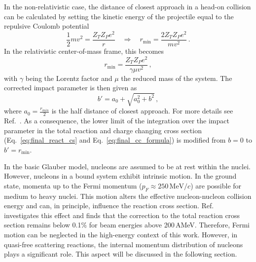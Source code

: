 \begin{description}
In the non-relativistic case, the distance of closest approach in a head-on collision can be calculated by setting the kinetic energy of the projectile equal to the repulsive Coulomb potential
\begin{equation}
\frac{1}{2}mv^{2} = \frac{Z_T Z_P e^{2}}{r} \quad \Rightarrow \quad r_{\text{min}} = \frac{2 Z_T Z_P e^{2}}{m v^2} \, .
\end{equation}
In the relativistic center-of-mass frame, this becomes
\begin{equation}
r_{\text{min}} = \frac{Z_T Z_P e^{2}}{\gamma \mu v^2} \, ,
\end{equation}
with $\gamma$ being the Lorentz factor and $\mu$ the reduced mass of the system.
The corrected impact parameter is then given as
\begin{equation}
b' = a_0 + \sqrt{a_{0}^2 + b^2} \, ,
\end{equation}
where $a_0 = \frac{r_{min}}{2}$ is the half distance of closest approach. For more details see Ref.~\cite{teixeira2022nuclear}.
As a consequence, the lower limit of the integration over the impact parameter in the total reaction and charge changing cross section (Eq.~\ref{eq:final_react_cs} and Eq.~\ref{eq:final_cc_formula}) is modified from $b=0$ to $b'= r_{\text{min}}$.

\item[Fermi Motion]
In the basic Glauber model, nucleons are assumed to be at rest within the nuclei. However, nucleons in a bound system exhibit intrinsic motion. In the ground state, momenta up to the Fermi momentum ($p_F \approx 250\,\mathrm{MeV}/c$) are possible for medium to heavy nuclei. This motion alters the effective nucleon-nucleon collision energy and can, in principle, influence the reaction cross section.
Ref.~\cite{teixeira2022nuclear} investigates this effect and finds that the correction to the total reaction cross section remains below 0.1\% for beam energies above 200\,AMeV. Therefore, Fermi motion can be neglected in the high-energy context of this work.
However, in quasi-free scattering reactions, the internal momentum distribution of nucleons plays a significant role. This aspect will be discussed in the following section.

\end{description}

\clearpage

